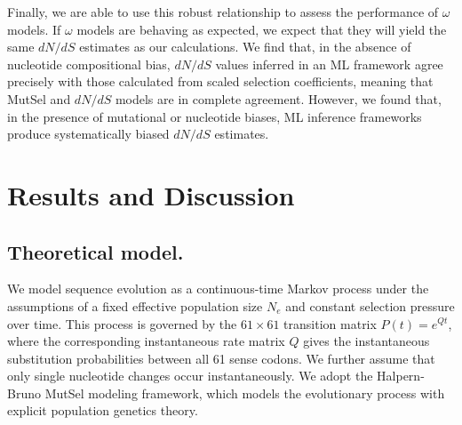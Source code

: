 \documentclass{pnastwo}
\begin{document}
\begin{article}
Finally, we are able to use this robust relationship to assess the performance of $\omega$ models. If $\omega$ models are behaving as expected, we expect that they will yield the same $dN/dS$ estimates as our calculations. We find that, in the absence of nucleotide compositional bias, $dN/dS$ values inferred in an ML framework agree precisely with those calculated from scaled selection coefficients, meaning that MutSel and $dN/dS$ models are in complete agreement. However, we found that, in the presence of mutational or nucleotide biases, ML inference frameworks produce systematically biased $dN/dS$ estimates. 
		
		
\section*{Results and Discussion}
		
		
\subsection*{Theoretical model.}

We model sequence evolution as a continuous-time Markov process \cite{Yang2006} under the assumptions of a fixed effective population size $N_e$ and constant selection pressure over time. This process is governed by the $61 \times 61$ transition matrix $P(t) = e^{Qt}$, where the corresponding instantaneous rate matrix $Q$ gives the instantaneous substitution probabilities between all 61 sense codons. We further assume that only single nucleotide changes occur instantaneously. We adopt the Halpern-Bruno \cite{HalpernBruno1998,YangNielsen2008,Tamurietal2012,Thorne2012} MutSel modeling framework, which models the evolutionary process with explicit population genetics theory. 


\end{article}
\end{document}
